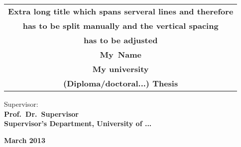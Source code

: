 


\begin{center}

\hrulefill

\setlength\fboxsep{0pt}
\setlength\fboxrule{1pt}



\vspace*{0.5cm}
\begin{tabular}{c}
      \vspace*{0.3cm}

      
      {\LARGE\bfseries {Extra long title which spans serveral lines and therefore}}\\
      {\LARGE\bfseries {has to be split manually and the vertical spacing\vspace{0.3cm}}}\\
      {\LARGE\bfseries {has to be adjusted\vspace{1.5cm}}}\\
      
      {\bf\Large \bf{My~Name\vspace{0.3cm}}}\\
			{\textbf{My university\vspace{1cm}}}\\
      {\large \textsf{\bf{(Diploma/doctoral...) Thesis\vspace{0.5cm}}}}\\
%    
%           
\end{tabular}

 


\vspace{10cm}

Supervisor:\\
\vspace{0.5cm}
\large\bf{Prof.~Dr.~Supervisor}\\
\vspace{0.2cm}
{\textbf{Supervisor's Department, University of ...}}\\
\vspace{0.5cm}











\vfill


\textsf{\bf{March 2013}}




\hrulefill

\end{center}
